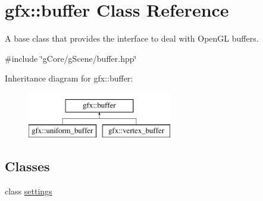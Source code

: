 \hypertarget{classgfx_1_1buffer}{\section{gfx\-:\-:buffer Class Reference}
\label{classgfx_1_1buffer}
}


A base class that provides the interface to deal with Open\-G\-L buffers.  




{\ttfamily \#include \char`\"{}g\-Core/g\-Scene/buffer.\-hpp\char`\"{}}

Inheritance diagram for gfx\-:\-:buffer\-:\begin{figure}[H]
\begin{center}
\leavevmode
\includegraphics[height=2.000000cm]{classgfx_1_1buffer}
\end{center}
\end{figure}
\subsection*{Classes}
\begin{DoxyCompactItemize}
\item 
class \hyperlink{classgfx_1_1buffer_1_1settings}{settings}
\end{DoxyCompactItemize}
